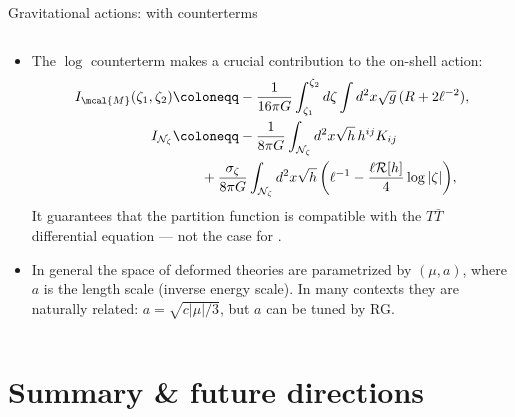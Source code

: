 \documentclass[
	10pt
	,noamsthm
]{beamer}
\begin{document}
\begin{frame}{Gravitational actions: with counterterms}{%
	\textcite{Caputa:2020lpa,Li:2020zjb}
}
\begin{columns}
\begin{column}{1.1\textwidth}
\vspace{-.3\baselineskip}
\begin{itemize}

\item The $\log$ counterterm makes a crucial contribution to the on-shell action:
	\begin{align*}
		I_{\mcal{M}}(\zeta_1, \zeta_2) & \coloneqq - \frac{1}{16\pi G} \int_{\zeta_1}^{\zeta_2} d\zeta \int d^2 x \sqrt{g} \, (R + 2 \ell^{-2}),  %
	\\
		I_{\mathcal N_{\zeta}} & \coloneqq  - \frac{1}{8\pi G} \int_{\mathcal N_{\zeta}} d^2x \sqrt{h}\,h^{ij} K_{ij} 
	\\& \qquad + \frac{\sigma_\zeta}{8\pi G} \int_{\mathcal N_{\zeta}} d^2x \sqrt{h} \, \bigg(\ell^{-1} - \frac{\ell  \mathcal{R}[h]}{4} \log |\zeta| \bigg), %
	\end{align*}
	It guarantees that the partition function is compatible with the $T\bar T$ differential equation --- not the case for \textsl{\citeauthor{Donnelly:2018bef}}.
	
	\item In general the space of deformed theories are parametrized by $(\mu,a)$, where $a$ is the length scale (inverse energy scale). In many contexts they are naturally related: $a = \sqrt{c|\mu|/3}$, but $a$ can be tuned by RG.
	
\end{itemize}
\end{column}
\end{columns}
\end{frame}


\section{Summary \& future directions}
\end{document}
